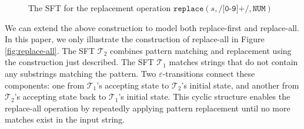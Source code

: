 \begin{figure}[h] \centering
  \caption{The SFT for the replacement operation $\texttt{replace}(s,\texttt{/[0-9]+/}, \texttt{NUM})$}
  \label{fig-rearranged-automata}
  \end{figure}

  We can extend the above construction to model both replace-first and replace-all. In this paper, we only illustrate the construction of replace-all in Figure \ref{fig:replace-all}. The SFT $\mathcal{T}_2$ combines pattern matching and replacement using the construction just described. The SFT $\mathcal{T}_1$ matches strings that do not contain any substrings matching the pattern. Two $\varepsilon$-transitions connect these components: one from $\mathcal{T}_1$'s accepting state to $\mathcal{T}_2$'s initial state, and another from $\mathcal{T}_2$'s accepting state back to $\mathcal{T}_1$'s initial state. This cyclic structure enables the replace-all operation by repeatedly applying pattern replacement until no more matches exist in the input string.




